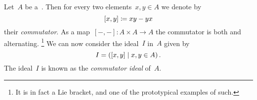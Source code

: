 %     

Let~$A$ be a~{\kalg}.
Then for every two elements~$x, y \in A$ we denote by
\[
            [x,y]
  \coloneqq  xy - yx
\]
their \emph{commutator}.
As a map~$[-,-] \colon A \times A \to A$ the commutator is both {\kbil} and alternating.%
\footnote{It is in fact a Lie bracket, and one of the prototypical examples of such.}
We can now consider the {\twosided} ideal~$I$ in~$A$ given by
\[
    I
  = \genideal{ [x,y] \suchthat x, y \in A } \,.
\]
The ideal~$I$ is known as the \emph{commutator ideal} of~$A$.

